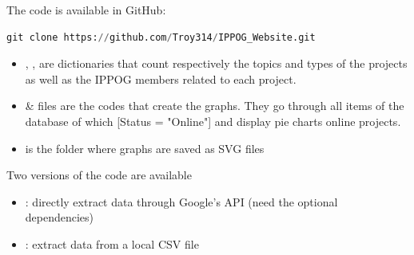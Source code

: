 The code is available in GitHub: 
\begin{lstlisting}[language=Python]
    git clone https://github.com/Troy314/IPPOG_Website.git
\end{lstlisting}

\begin{itemize}
    \item {}, ,  are dictionaries that count respectively the topics and types of the projects as well as the IPPOG members related to each project. 
    \item {} \&  files are the codes that create the graphs. They go through all items of the database of which [Status = "Online"] and display pie charts online projects.
    \item {} is the folder where graphs are saved as SVG files
\end{itemize}


Two versions of the code are available
\begin{itemize}
    \item {}: directly extract data through Google's API (need the optional dependencies)
    \item {}: extract data from a local CSV file 
\end{itemize}

